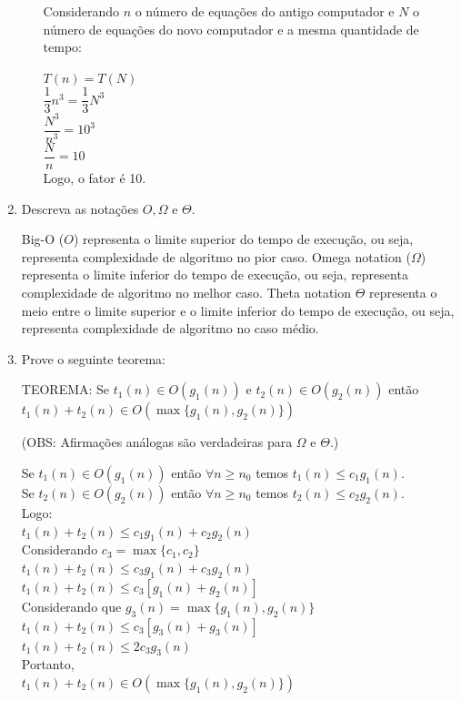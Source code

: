 \documentclass[12pt,a4paper]{article}
\begin{document}
\begin{enumerate}
\begin{enumerate}
		Considerando $n$ o número de equações do antigo computador e $N$ o número de equações do novo computador e a mesma quantidade de tempo:
		
		$T(n) = T(N)$\\
		$\dfrac{1}{3}n^3 = \dfrac{1}{3}N^3$\\
		$\dfrac{N^3}{n^3} = 10^3$\\
		$\dfrac{N}{n} = 10$\\
		Logo, o fator é 10.
	\end{enumerate}




	\item Descreva as notações $O, \Omega$ e $\Theta$.
	
	Big-O ($O$) representa o limite superior do tempo de execução, ou seja, representa complexidade de algoritmo no pior caso. Omega notation ($\Omega$) representa o limite inferior do tempo de execução, ou seja, representa complexidade de algoritmo no melhor caso. Theta notation $\Theta$ representa o meio entre o limite superior e o limite inferior do tempo de execução, ou seja, representa complexidade de algoritmo no caso médio.
	
	
	
	\item Prove o seguinte teorema:
	
	TEOREMA: Se $t_1(n) \in O(g_1(n))$ e $t_2(n) \in O(g_2(n))$ então $t_1 (n) + t_2(n) \in O(\max\{g_1(n), g_2 (n)\})$
	
	(OBS: Afirmações análogas são verdadeiras para $\Omega$ e $\Theta$.)
	
	Se $t_1(n) \in O(g_1(n))$ então  $\forall n \geq n_0$ temos $t_1(n) \leq c_1g_1(n)$.\\
	Se $t_2(n) \in O(g_2(n))$ então  $\forall n \geq n_0$ temos $t_2(n) \leq c_2g_2(n)$.\\
	Logo:\\
	$t_1(n)+t_2(n) \leq c_1g_1(n) + c_2g_2(n)$\\
	Considerando $c_3=\max\{c_1,c_2\}$\\
	$t_1(n)+t_2(n) \leq c_3g_1(n) + c_3g_2(n)$\\
	$t_1(n)+t_2(n) \leq c_3[g_1(n) + g_2(n)]$\\
	Considerando que $g_3(n)=\max\{g_1(n),g_2(n)\}$\\	
	$t_1(n)+t_2(n) \leq c_3[g_3(n) + g_3(n)]$\\
	$t_1(n)+t_2(n) \leq 2c_3g_3(n)$\\
	Portanto,\\
	$t_1 (n) + t_2(n) \in O(\max\{g_1(n), g_2 (n)\})$ 
	

\end{enumerate}
\end{document}
